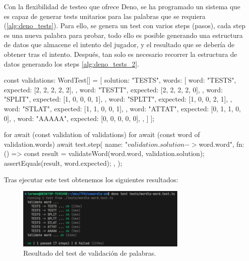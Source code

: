 Con la flexibilidad de testeo que ofrece Deno, se ha programado un sistema que es capaz de generar tests unitarios para las palabras que se requiera (\ref{alg:deno_tests}). Para ello, se genera un test con varios steps (pasos), cada step es una nueva palabra para probar, todo ello es posible generando una estructura de datos que almacene el intento del jugador, y el resultado que se debería de obtener tras el intento. Después, tan solo es necesario recorrer la estructura de datos generando los steps \ref{alg:deno_tests_2}.

\begin{mytypescript}[float={!h},caption={Implementación del sistema de creación de test automáticos.},label={alg:deno_tests}]
	const validations: WordTest[] = [
		{ solution: "TESTS", words: [
			{
				word: "TESTS",
				expected: [2, 2, 2, 2, 2],
			},
			{
				word: "TESTT",
				expected: [2, 2, 2, 2, 0],
			},
			{
				word: "SPLIT",
				expected: [1, 0, 0, 0, 1],
			},
			{
				word: "SPLTT",
				expected: [1, 0, 0, 2, 1],
			},
			{
				word: "STLAT",
				expected: [1, 1, 0, 0, 1],
			},
			{
				word: "ATTAT",
				expected: [0, 1, 1, 0, 0],
			},
			{
				word: "AAAAA",
				expected: [0, 0, 0, 0, 0],
			},
			]
		}
	];
\end{mytypescript}

\begin{mytypescript}[float={!h},caption={Implementación del sistema de creación de test automáticos.},label={alg:deno_tests_2}]
	for await (const validation of validations) {
		for await (const word of validation.words) {
			await test.step({
				name: "${validation.solution} -> ${word.word}",
				fn: () => {
					const result = validateWord(word.word, validation.solution);
					assertEquals(result, word.expected);
				},
			});
		}
	}
\end{mytypescript}

Tras ejecutar este test obtenemos los siguientes resultados:

\begin{figure}[H]
	\centering
	\includegraphics[clip=true, width=0.75\textwidth]{images/tests/deno_test_wordle.png}
	\caption{Resultado del test de validación de palabras.}
	\label{fig:deno_test}
\end{figure}

